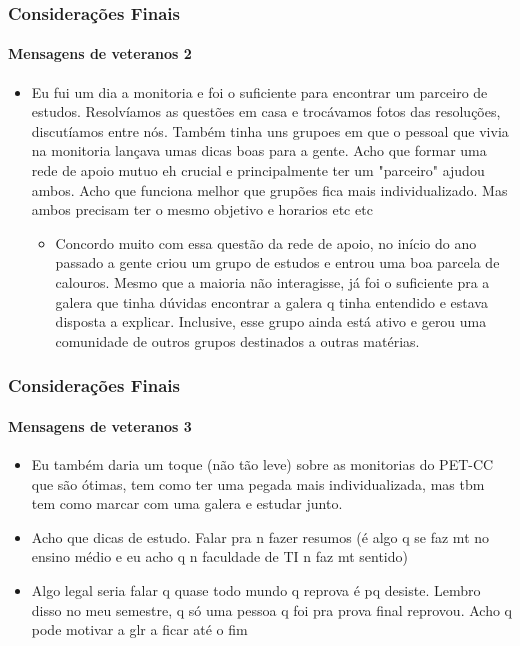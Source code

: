\begin{frame}
	\frametitle{Considerações Finais}
	\framesubtitle{Mensagens de veteranos 2}

	\begin{itemize}
		\item Eu fui um dia a monitoria e foi o suficiente para encontrar um parceiro de estudos. Resolvíamos as questões em casa e trocávamos fotos das resoluções, discutíamos entre nós. Também tinha uns grupoes em que o pessoal que vivia na monitoria lançava umas dicas boas para a gente. Acho que formar uma rede de apoio mutuo eh crucial e principalmente ter um "parceiro" ajudou ambos. Acho que funciona melhor que grupões fica mais individualizado. Mas ambos precisam ter o mesmo objetivo e horarios etc etc
		\begin{itemize}
			\item Concordo muito com essa questão da rede de apoio, no início do ano passado a gente criou um grupo de estudos e entrou uma boa parcela de calouros. Mesmo que a maioria não interagisse, já foi o suficiente pra a galera que tinha dúvidas encontrar a galera q tinha entendido e estava disposta a explicar. Inclusive, esse grupo ainda está ativo e gerou uma comunidade de outros grupos destinados a outras matérias.
		\end{itemize}
	\end{itemize}

\end{frame}


\begin{frame}
	\frametitle{Considerações Finais}
	\framesubtitle{Mensagens de veteranos 3}

	\begin{itemize}
		\item Eu também daria um toque (não tão leve) sobre as monitorias do PET-CC que são ótimas, tem como ter uma pegada mais individualizada, mas tbm tem como marcar com uma galera e estudar junto.
		\item Acho que dicas de estudo.
		Falar pra n fazer resumos (é algo q se faz mt no ensino médio e eu acho q n faculdade de TI n faz mt sentido)
		\item Algo legal seria falar q quase todo mundo q reprova é pq desiste. Lembro disso no meu semestre, q só uma pessoa q foi pra prova final reprovou. Acho q pode motivar a glr a ficar até o fim
	\end{itemize}

\end{frame}


